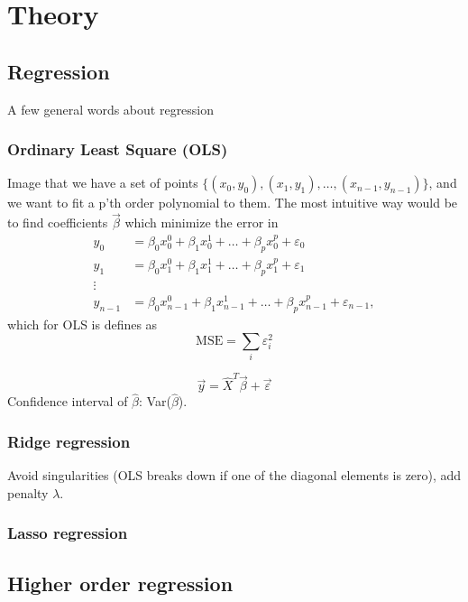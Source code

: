 \section{Theory} \label{sec:theory}

\subsection{Regression} \label{sec:regression}
A few general words about regression

\subsubsection{Ordinary Least Square (OLS)} \label{sec:OLS}
Image that we have a set of points $\{(x_0, y_0), (x_1, y_1),\hdots, (x_{n-1}, y_{n-1})\}$, and we want to fit a p'th order polynomial to them. The most intuitive way would be to find coefficients $\vec{\beta}$ which minimize the error in
\begin{align*}
y_0&=\beta_0x_0^0+\beta_1x_0^1+\hdots+\beta_px_0^p+\varepsilon_0\\
y_1&=\beta_0x_1^0+\beta_1x_1^1+\hdots+\beta_px_1^p+\varepsilon_1\\
\vdots\\
y_{n-1}&=\beta_0x_{n-1}^0+\beta_1x_{n-1}^1+\hdots+\beta_px_{n-1}^p+\varepsilon_{n-1},
\end{align*}
which for OLS is defines as
\begin{equation}
\text{MSE}=\sum_i\varepsilon_i^2
\end{equation}


\begin{equation}
\vec{y}=\hat{X}^T\vec{\beta}+\vec{\varepsilon}
\end{equation}
Confidence interval of $\hat{\beta}$: Var($\hat{\beta}$).

\subsubsection{Ridge regression} \label{sec:ridge}
Avoid singularities (OLS breaks down if one of the diagonal elements is zero), add penalty $\lambda$.

\subsubsection{Lasso regression} \label{sec:lasso}


\subsection{Higher order regression} \label{sec:higher_reg}

